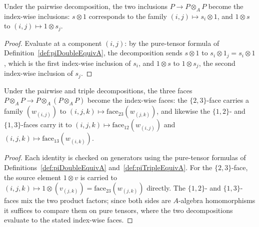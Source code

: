 \begin{lemma}
  \label{lem:descentIncl_transport}
  \leanok
  Under the pairwise decomposition, the two inclusions \(P \to P \otimes_A P\) become the
  index-wise inclusions: \(s \otimes 1\) corresponds to the family
  \((i,j) \mapsto s_i \otimes 1\), and \(1 \otimes s\) to \((i,j) \mapsto 1 \otimes s_j\).
\end{lemma}
\begin{proof}
  \leanok
  Evaluate at a component \((i,j)\): by the pure-tensor formula of
  Definition~\ref{def:piDoubleEquivA}, the decomposition sends \(s \otimes 1\) to
  \(s_i \otimes 1_j = s_i \otimes 1\), which is the first index-wise inclusion of \(s_i\), and
  \(1 \otimes s\) to \(1 \otimes s_j\), the second index-wise inclusion of \(s_j\).
\end{proof}

\begin{lemma}
  \label{lem:descentFace_transport}
  \leanok
  Under the pairwise and triple decompositions, the three faces \(P \otimes_A P \to
  P \otimes_A (P \otimes_A P)\) become the index-wise faces: the \(\{2,3\}\)-face carries a
  family \((w_{(i,j)})\) to \((i,j,k) \mapsto \mathrm{face}_{23}(w_{(j,k)})\), and likewise the
  \(\{1,2\}\)- and \(\{1,3\}\)-faces carry it to
  \((i,j,k) \mapsto \mathrm{face}_{12}(w_{(i,j)})\) and
  \((i,j,k) \mapsto \mathrm{face}_{13}(w_{(i,k)})\).
\end{lemma}
\begin{proof}
  \leanok
  Each identity is checked on generators using the pure-tensor formulas of
  Definitions~\ref{def:piDoubleEquivA} and~\ref{def:piTripleEquivA}. For the \(\{2,3\}\)-face,
  the source element \(1 \otimes v\) is carried to
  \((i,j,k) \mapsto 1 \otimes (v_{(j,k)}) = \mathrm{face}_{23}(w_{(j,k)})\) directly. The
  \(\{1,2\}\)- and \(\{1,3\}\)-faces mix the two product factors; since both sides are
  \(A\)-algebra homomorphisms it suffices to compare them on pure tensors, where the two
  decompositions evaluate to the stated index-wise faces.
\end{proof}

